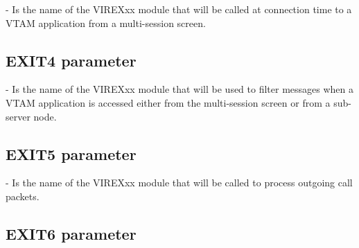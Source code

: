 \documentclass[letterpaper,10pt,english]{sphinxmanual}
\begin{document}
 - Is the name of the VIREXxx module that will be called at connection time to a VTAM application from a multi-session screen.

\ignorespaces 

\subsection{EXIT4 parameter}
\label{\detokenize{Installation_Guide:exit4-parameter}}\label{\detokenize{Installation_Guide:index-58}}
\begin{sphinxVerbatim}[commandchars=\\\{\}]
 
\end{sphinxVerbatim}

 - Is the name of the VIREXxx module that will be used to filter messages when a VTAM application is accessed either from the multi-session screen or from a sub-server node.

\ignorespaces 

\subsection{EXIT5 parameter}
\label{\detokenize{Installation_Guide:exit5-parameter}}\label{\detokenize{Installation_Guide:index-59}}
\begin{sphinxVerbatim}[commandchars=\\\{\}]
 
\end{sphinxVerbatim}

 - Is the name of the VIREXxx module that will be called to process outgoing call packets.

\ignorespaces 

\subsection{EXIT6 parameter}
\label{\detokenize{Installation_Guide:exit6-parameter}}\label{\detokenize{Installation_Guide:index-60}}
\begin{sphinxVerbatim}[commandchars=\\\{\}]
 
\end{sphinxVerbatim}
\end{document}
